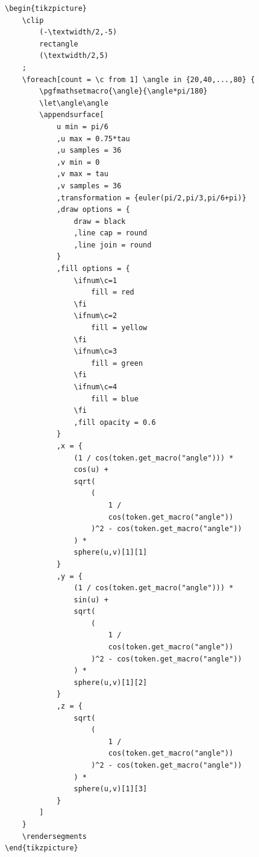 \documentclass[12pt]{report}
\begin{document}
\begin{verbatim}
\begin{tikzpicture}
    \clip 
        (-\textwidth/2,-5) 
        rectangle 
        (\textwidth/2,5)
    ;
    \foreach[count = \c from 1] \angle in {20,40,...,80} {
        \pgfmathsetmacro{\angle}{\angle*pi/180}
        \let\angle\angle
        \appendsurface[
            u min = pi/6
            ,u max = 0.75*tau
            ,u samples = 36 
            ,v min = 0
            ,v max = tau
            ,v samples = 36
            ,transformation = {euler(pi/2,pi/3,pi/6+pi)}
            ,draw options = {
                draw = black
                ,line cap = round
                ,line join = round
            }
            ,fill options = {
                \ifnum\c=1
                    fill = red
                \fi
                \ifnum\c=2
                    fill = yellow
                \fi
                \ifnum\c=3
                    fill = green
                \fi
                \ifnum\c=4
                    fill = blue
                \fi
                ,fill opacity = 0.6
            }
            ,x = {
                (1 / cos(token.get_macro("angle"))) *
                cos(u) + 
                sqrt(
                    (
                        1 / 
                        cos(token.get_macro("angle"))
                    )^2 - cos(token.get_macro("angle"))
                ) * 
                sphere(u,v)[1][1]
            }
            ,y = {
                (1 / cos(token.get_macro("angle"))) *
                sin(u) + 
                sqrt(
                    (
                        1 / 
                        cos(token.get_macro("angle"))
                    )^2 - cos(token.get_macro("angle"))
                ) * 
                sphere(u,v)[1][2]
            }
            ,z = {
                sqrt(
                    (
                        1 / 
                        cos(token.get_macro("angle"))
                    )^2 - cos(token.get_macro("angle"))
                ) * 
                sphere(u,v)[1][3]
            }
        ]
    }
    \rendersegments
\end{tikzpicture}
\end{verbatim}
\end{document}

